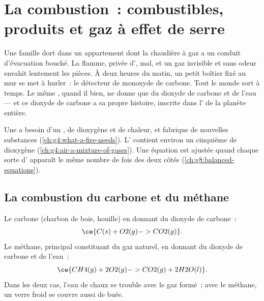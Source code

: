 \chapter{La combustion~: combustibles, produits et gaz à effet de serre}\label{ch:g8:combustion-and-fuels}

Une famille dort dans un appartement dont la chaudière à gaz a un conduit
d'évacuation bouché. La flamme, privée d',  mal, et un gaz
invisible et sans odeur envahit lentement les pièces. À deux heures du
matin, un petit boîtier fixé au mur se met à hurler~: le détecteur de
monoxyde de carbone. Tout le monde sort à temps. Le même ,
quand il  bien, ne donne que du dioxyde de carbone et de l'eau ---
et ce dioxyde de carbone a sa propre histoire, inscrite dans l' de la
planète entière.

\begin{recall}
Une  a besoin d'un , de dioxygène et de chaleur, et
fabrique de nouvelles substances (\cref{ch:g4:what-a-fire-needs}). L'
contient environ un cinquième de dioxygène
(\cref{ch:g4:air-a-mixture-of-gases}). Une équation est ajustée quand
chaque sorte d' apparaît le même nombre de fois des deux côtés
(\cref{ch:g8:balanced-equations}).
\end{recall}

\section{La combustion du carbone et du méthane}

\begin{example}\label{ex:g8:combustion-and-fuels:two}
Le carbone (charbon de bois, houille)  en donnant du dioxyde de
carbone~:
\[
  \ce{C(s) + O2(g) -> CO2(g)}.
\]
Le méthane, principal constituant du gaz naturel,  en donnant du
dioxyde de carbone et de l'eau~:
\[
  \ce{CH4(g) + 2O2(g) -> CO2(g) + 2H2O(l)}.
\]
Dans les deux cas, l'eau de chaux se trouble avec le gaz formé~; avec
le méthane, un verre froid se couvre aussi de buée.
\end{example}

